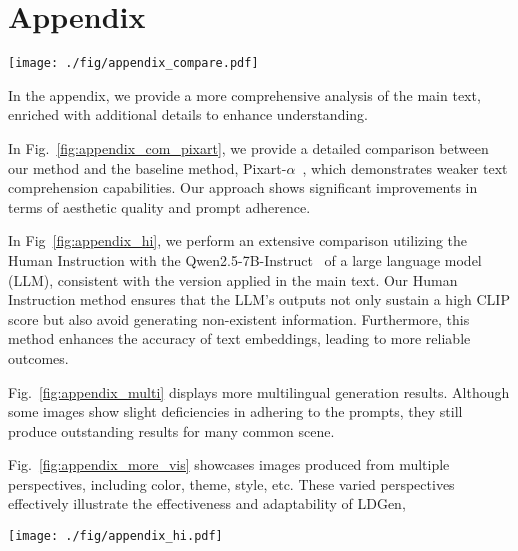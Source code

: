 
\clearpage

\appendix
\section{Appendix}
\begin{figure*}[b]
  \centering
  \texttt{[image: ./fig/appendix\_compare.pdf]}

  \caption{ More comparisons with Pixart-$\alpha$. Our method achieves better results in terms of prompt adherence and visua appeal.}
  \label{fig:appendix_com_pixart}
\end{figure*}




In the appendix, we provide a more comprehensive analysis of the main text, enriched with additional details to enhance understanding.

In Fig.~\ref{fig:appendix_com_pixart}, we provide a detailed comparison between our method and the baseline method, Pixart-$\alpha$~\cite{chen2023pixart}, which demonstrates weaker text comprehension capabilities. Our approach shows significant improvements in terms of aesthetic quality and prompt adherence.

In Fig~\ref{fig:appendix_hi}, we perform an extensive comparison utilizing the Human Instruction with the Qwen2.5-7B-Instruct~\cite{yang2024qwen2} of a large language model (LLM), consistent with the version applied in the main text. Our Human Instruction method ensures that the LLM's outputs not only sustain a high CLIP score but also avoid generating non-existent information. Furthermore, this method enhances the accuracy of text embeddings, leading to more reliable outcomes.

Fig.~\ref{fig:appendix_multi} displays more multilingual generation results. Although some images show slight deficiencies in adhering to the prompts, they still produce outstanding results for many common scene. 


Fig.~\ref{fig:appendix_more_vis} showcases images produced from multiple perspectives, including color, theme, style, etc. These varied perspectives effectively illustrate the effectiveness and adaptability of LDGen, 









\begin{figure*}[t]
  \centering
  \texttt{[image: ./fig/appendix\_hi.pdf]}
  \caption{ We provide detailed comparisons using human instructions ranging from simple to complex, comprehensively evaluating the effectiveness of our method.
  }
  \label{fig:appendix_hi}
\end{figure*}

